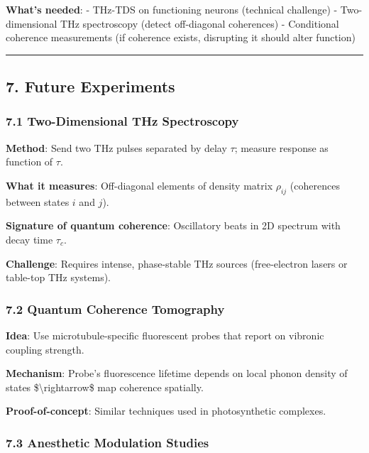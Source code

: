 \textbf{What's needed}: - THz-TDS on functioning neurons
(technical challenge) - Two-dimensional THz spectroscopy (detect
off-diagonal coherences) - Conditional coherence measurements (if
coherence exists, disrupting it should alter function)

\begin{center}\rule{0.5\linewidth}{0.5pt}\end{center}

\subsection{7. Future Experiments}\label{future-experiments}

\subsubsection{7.1 Two-Dimensional THz
Spectroscopy}\label{two-dimensional-thz-spectroscopy}

\textbf{Method}: Send two THz pulses separated by delay \(\tau\);
measure response as function of \(\tau\).

\textbf{What it measures}: Off-diagonal elements of density matrix
\(\rho_{ij}\) (coherences between states \(i\) and \(j\)).

\textbf{Signature of quantum coherence}: Oscillatory beats in 2D
spectrum with decay time \(\tau_c\).

\textbf{Challenge}: Requires intense, phase-stable THz sources
(free-electron lasers or table-top THz systems).

\subsubsection{7.2 Quantum Coherence
Tomography}\label{quantum-coherence-tomography}

\textbf{Idea}: Use microtubule-specific fluorescent probes that report
on vibronic coupling strength.

\textbf{Mechanism}: Probe's fluorescence lifetime
depends on local phonon density of states \$\textbackslash rightarrow\$
map coherence spatially.

\textbf{Proof-of-concept}: Similar techniques used in photosynthetic
complexes.

\subsubsection{7.3 Anesthetic Modulation
Studies}\label{anesthetic-modulation-studies}

